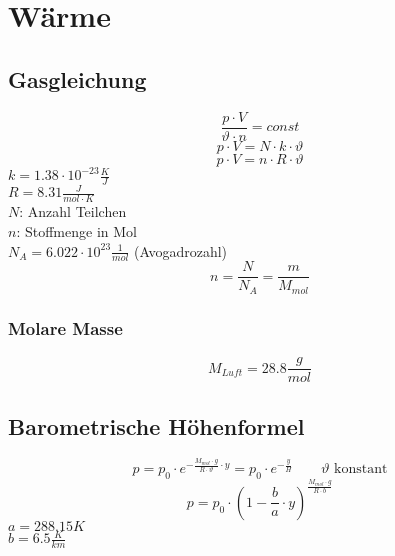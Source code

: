 



\chapter{Wärme}

\section{Gasgleichung}
\[ \boxed{\frac{p \cdot V}{\vartheta \cdot n} = const} \]
\[ \boxed{p \cdot V = N \cdot k \cdot \vartheta} \]
\[ \boxed{p \cdot V = n \cdot R \cdot \vartheta} \]
$k = 1.38 \cdot 10^{-23} \frac{K}{J}$ \\
$R = 8.31 \frac{J}{mol \cdot K}$ \\
$N$: Anzahl Teilchen \\
$n$: Stoffmenge in Mol \\
$N_A = 6.022 \cdot 10^{23} \frac{1}{mol}$ (Avogadrozahl) \\
\[ n = \frac{N}{N_A} = \frac{m}{M_{mol}} \]
\subsection{Molare Masse}
\[ M_{Luft} = 28.8 \frac{g}{mol} \]

\section{Barometrische Höhenformel}
\[ \boxed{p 
= p_0 \cdot e^{- \frac{M_{mol} \cdot g}{R \cdot \vartheta} \cdot y} 
= p_0 \cdot e^{- \frac{y}{H}}} \qquad \text{$\vartheta$ konstant}\]
\[ \boxed{p = p_0 \cdot \left(1 - \frac{b}{a} \cdot y\right)^
{\frac{M_{mol} \cdot g}{R \cdot b}}} \]
$a = 288.15 K$ \\
$b = 6.5 \frac{K}{km}$ \\

